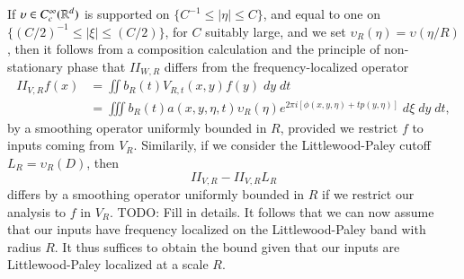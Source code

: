 If $\upsilon \in C_c^\infty(\operatorname{\mathbb{R}}^d)$ is supported on $\{ C^{-1} \leq |\eta| \leq C \}$, and equal to one on $\{ (C/2)^{-1} \leq |\xi| \leq (C/2) \}$, for $C$ suitably large, and we set $\upsilon_R(\eta) = \upsilon ( \eta / R)$, then it follows from a composition calculation and the principle of non-stationary phase that $II_{W,R}$ differs from the frequency-localized operator
%
\begin{align*}
    II_{V,R} f(x) &= \iint b_R(t) V_{R,t}(x,y) f(y)\; dy\; dt\\
    &= \iiint b_R(t) a(x,y,\eta,t) \upsilon_R(\eta) e^{2 \pi i [\phi(x,y,\eta) + t p(y,\eta)]}\; d\xi\; dy\; dt,
\end{align*}
%
by a smoothing operator uniformly bounded in $R$, provided we restrict $f$ to inputs coming from $V_R$. Similarily, if we consider the Littlewood-Paley cutoff $L_R = \upsilon_R(D)$, then
%
\[ II_{V,R} - II_{V,R} L_R \]
%
differs by a smoothing operator uniformly bounded in $R$ if we restrict our analysis to $f$ in $V_R$. TODO: Fill in details. It follows that we can now assume that our inputs have frequency localized on the Littlewood-Paley band with radius $R$. It thus suffices to obtain the bound given that our inputs are Littlewood-Paley localized at a scale $R$.

